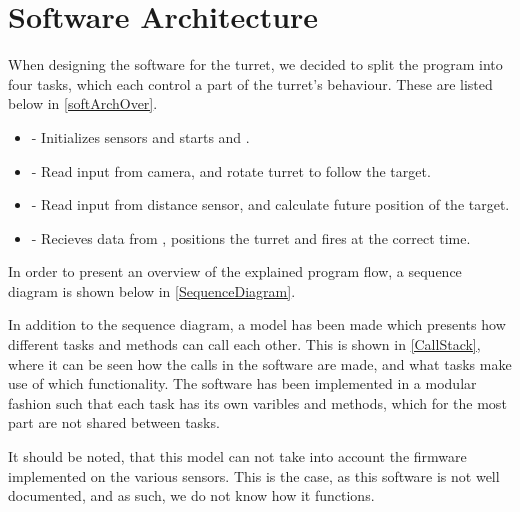 \section{Software Architecture}
When designing the software for the turret, we decided to split the program
into four tasks, which each control a part of the turret's behaviour. These are
listed below in \autoref{softArchOver}.

\begin{itemize}\label{softArchOver}
  \item {} - Initializes sensors and starts  and
  .
  \item {} - Read input from camera, and rotate turret to follow the
  target.
  \item {} - Read input from distance sensor, and
  calculate future position of the target.
  \item {} - Recieves data from ,
  positions the turret and fires at the correct time.
\end{itemize}

In order to present an overview of the explained program flow, a sequence
diagram is shown below in \autoref{SequenceDiagram}.


In addition to the sequence diagram, a model has been made which presents how
different tasks and methods can call each other. This is shown in
\autoref{CallStack}, where it can be seen how the calls in the software are
made, and what tasks make use of which functionality. The software has been
implemented in a modular fashion such that each task has its own varibles and
methods, which for the most part are not shared between tasks.\nl


It should be noted, that this model can not take into account the firmware
implemented on the various sensors. This is the case, as this software is not
well documented, and as such, we do not know how it functions.
